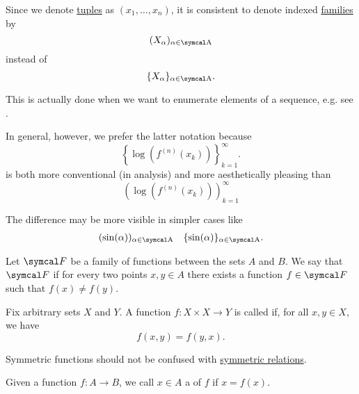 \begin{remark}\label{remark:indexed_family_notation}
  Since we denote \hyperref[def:cartesian_product]{tuples} as \( (x_1, \ldots, x_n) \), it is consistent to denote indexed \hyperref[def:indexed_family]{families} by
  \begin{equation*}
    ( X_\al )_{\al \in \CA}
  \end{equation*}
  instead of
  \begin{equation*}
    \{ X_\al \}_{\al \in \CA}.
  \end{equation*}

  This is actually done when we want to enumerate elements of a sequence, e.g. see .

  In general, however, we prefer the latter notation because
  \begin{equation*}
    \left\{ \log \left( f^{(n)}(x_k) \right) \right\}_{k=1}^\infty.
  \end{equation*}
  is both more conventional (in analysis) and more aesthetically pleasing than
  \begin{equation*}
    \left( \log \left( f^{(n)}(x_k) \right) \right)_{k=1}^\infty
  \end{equation*}

  The difference may be more visible in simpler cases like
  \begin{align*}
    (\sin(\al))_{\al \in \CA}
    &&
    \{\sin(\al)\}_{\al \in \CA}.
  \end{align*}
\end{remark}

\begin{definition}\label{def:family_of_functions_separates_points}
  Let \( \Cal{F} \) be a family of functions between the sets \( A \) and \( B \). We say that \( \Cal{F} \)  if for every two points \( x, y \in A \) there exists a function \( f \in \Cal{F} \) such that \( f(x) \neq f(y) \).
\end{definition}

\begin{definition}\label{def:symmetric_function}
  Fix arbitrary sets \( X \) and \( Y \). A function \( f: X \times X \to Y \) is called  if, for all \( x, y \in X \), we have
  \begin{equation*}
    f(x, y) = f(y, x).
  \end{equation*}

  Symmetric functions should not be confused with \hyperref[def:derived_relations/symmetric]{symmetric relations}.
\end{definition}

\begin{definition}\label{def:fixed_point}
  Given a function \( f: A \to B \), we call \( x \in A \) a  of \( f \) if \( x = f(x) \).
\end{definition}
